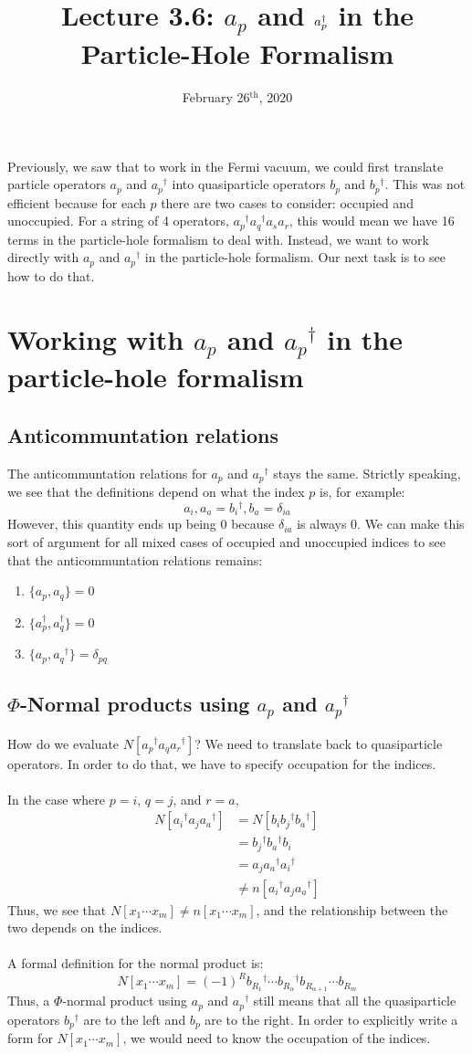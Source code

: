 \documentclass{article}
\title{Lecture 3.6:  $a_p$ and $a_p\dg$ in the Particle-Hole Formalism}
\date{February 26$^{\text{th}}$, 2020}
\newcommand{\dg}{\ensuremath{^\dagger} }
\newcommand{\cd}{\ensuremath{\cdots} }
\begin{document}
\maketitle
\noindent
Previously, we saw that to work in the Fermi vacuum, we could first translate 
particle operators $a_p$ and $a_p\dg$ into quasiparticle operators $b_p$ and $b_p\dg$. 
This was not efficient because for each $p$ there are two cases to consider: occupied and unoccupied.
For a string of 4 operators, $a_p\dg a_q\dg a_s a_r$, this would mean we have 16 terms in the particle-hole formalism to deal with. 
Instead, we want to work directly with $a_p$ and $a_p\dg$ in the particle-hole formalism. 
Our next task is to see how to do that. 
\section{ Working with $a_p$ and $a_p\dg$ in the particle-hole formalism }
\subsection{Anticommuntation relations}
The anticommuntation relations for $a_p$ and $a_p\dg$ stays the same.
Strictly speaking, we see that the definitions depend on what the index $p$ is,
for example:
\[{a_i, a_a} = {b_i\dg, b_a} = \delta_{ia}\]
However, this quantity ends up being 0 because $\delta_{ia}$ is always 0. 
We can make this sort of argument for all mixed cases of occupied and unoccupied indices to see that 
the anticommuntation relations remains:
\begin{enumerate}
\item  $\{a_p, a_q\} = 0$
\item $\{a_p^\dagger, a_q^\dagger \} = 0$
\item $\{a_p, a_q\dg \} = \delta_{pq}$
\end{enumerate}
\subsection{$\Phi$-Normal products using $a_p$ and $a_p\dg$}
How do we evaluate $N[a_p\dg a_q a_r\dg]$?
We need to translate back to quasiparticle operators. 
In order to do that, we have to specify occupation for the indices.  \\ \\
In the case where $p=i$, $q=j$, and $r=a$, 
\begin{align*}
N[a_i\dg a_j a_a\dg] &= N[b_i b_j\dg b_a\dg] \\
&= b_j\dg b_a\dg b_i \\
&= a_j a_a\dg a_i\dg \\
&\neq n[a_i\dg a_j a_a\dg]
\end{align*}
Thus, we see that $N[x_1\cd x_m] \neq n[x_1 \cd x_m]$, and the relationship between the two depends on the indices. \\  \\
A formal definition for the normal product is: 
\[N[x_1 \cd x_m]  = (-1)^R b_{R_1}\dg \cd b_{R_\alpha}\dg b_{R_{\alpha+1}} \cd b_{R_m} \]
Thus, a $\Phi$-normal product using $a_p$ and $a_p\dg$ still means that all the quasiparticle operators $b_p\dg$ are to the left and $b_p$ are to the right. 
In order to explicitly write a form for $N[x_1 \cd x_m]$, we would need to know the occupation of the indices. 
\end{document}
